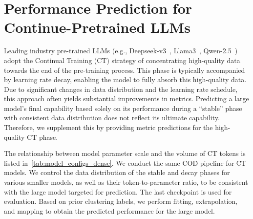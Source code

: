 

\section{Performance Prediction for Continue-Pretrained LLMs}
\label{sec:ppct}
Leading industry pre-trained LLMs (e.g., Deepseek-v3~\citep{deepseekai2025deepseekv3technicalreport}, Llama3~\citep{grattafiori2024llama}, Qwen-2.5~\citep{qwen2.5}) adopt the Continual Training (CT) strategy of concentrating high-quality data towards the end of the pre-training process. This phase is typically accompanied by learning rate decay, enabling the model to fully absorb this high-quality data. Due to significant changes in data distribution and the learning rate schedule, this approach often yields substantial improvements in metrics. Predicting a large model's final capability based solely on its performance during a ``stable'' phase with consistent data distribution does not reflect its ultimate capability. Therefore, we supplement this by providing metric predictions for the high-quality CT phase.

The relationship between model parameter scale and the volume of CT tokens is listed in~\cref{tab:model_configs_dense}. We conduct the same COD pipeline for CT models. We control the data distribution of the stable and decay phases for various smaller models, as well as their token-to-parameter ratio, to be consistent with the large model targeted for prediction. The last checkpoint is used for evaluation. Based on prior clustering labels, we perform fitting, extrapolation, and mapping to obtain the predicted performance for the large model. 

